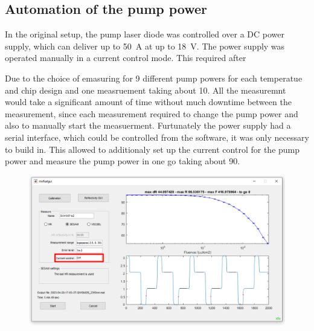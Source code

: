 \subsection{Automation of the pump power}{\label{subsubsection:pump}}

In the original setup, the pump laser diode was controlled over a DC power supply, which can deliver up to \qty{50}{\ampere} at up to \qty{18}{\volt}. The power supply was operated manually in a current control mode. This required after 

Due to the choice of emasuring for 9 different pump powers for each temperatue and chip design and one measruement taking about \qty{10}{\min}. All the measuremnt would take a significant amount of time without much downtime between the measurement, since each measurement required to change the pump power and also to manually start the measuerment. Furtunately the power supply had a serial interface, which could be controlled from the software, it was only necessary to build in. This allowed to additionaly set up the current control for the pump power and measure the pump power in one go taking about \qty{90}{\min}.

\begin{figure}[ht]
    \centering
    \includegraphics[width=0.8\linewidth]{images/software.png}
    \caption{}
\end{figure}
